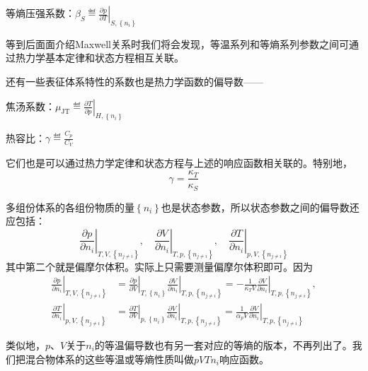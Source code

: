 \documentclass[main.tex]{subfiles}
\begin{document}
等熵压强系数：$\beta_S\eqdef\left.\frac{\partial p}{\partial T}\right|_{S,\left\{n_i\right\}}$

等到后面面介绍Maxwell关系时我们将会发现，等温系列和等熵系列参数之间可通过热力学基本定律和状态方程相互关联。

还有一些表征体系特性的系数也是热力学函数的偏导数——

焦汤系数：$\mu_\text{JT}\eqdef\left.\frac{\partial T}{\partial p}\right|_{H,\left\{n_i\right\}}$

热容比：$\gamma\eqdef\frac{C_p}{C_V}$

它们也是可以通过热力学定律和状态方程与上述的响应函数相关联的。特别地，
\begin{equation}
    \gamma=\frac{\kappa_T}{\kappa_S}
\end{equation}

多组份体系的各组份物质的量$\left\{n_i\right\}$也是状态参数，所以状态参数之间的偏导数还应包括：
\[\left.\frac{\partial p}{\partial n_i}\right|_{T,V,\left\{n_{j\neq i}\right\}},\quad\left.\frac{\partial V}{\partial n_i}\right|_{T,p,\left\{n_{j\neq i}\right\}},\quad\left.\frac{\partial T}{\partial n_i}\right|_{p,V,\left\{n_{j\neq i}\right\}}\]
其中第二个就是偏摩尔体积。实际上只需要测量偏摩尔体积即可。因为
\begin{align*}
    \left.\frac{\partial p}{\partial n_i}\right|_{T,V,\left\{n_{j\neq i}\right\}} & =\left.\frac{\partial p}{\partial V}\right|_{T,\left\{n_i\right\}}\left.\frac{\partial V}{\partial n_i}\right|_{T,p,\left\{n_{j\neq i}\right\}}=-\frac{1}{\kappa_TV}\left.\frac{\partial V}{\partial n_i}\right|_{T,p,\left\{n_{j\neq i}\right\}}, \\
    \left.\frac{\partial T}{\partial n_i}\right|_{p,V,\left\{n_{j\neq i}\right\}} & =\left.\frac{\partial T}{\partial V}\right|_{p,\left\{n_i\right\}}\left.\frac{\partial V}{\partial n_i}\right|_{T,p,\left\{n_{j\neq i}\right\}}=\frac{1}{\alpha_p V}\left.\frac{\partial V}{\partial n_i}\right|_{T,p,\left\{n_{j\neq i}\right\}}
\end{align*}

类似地，$p$、$V$关于$n_i$的等温偏导数也有另一套对应的等熵的版本，不再列出了。我们把混合物体系的这些等温或等熵性质叫做$pVTn_i$响应函数。
\end{document}
